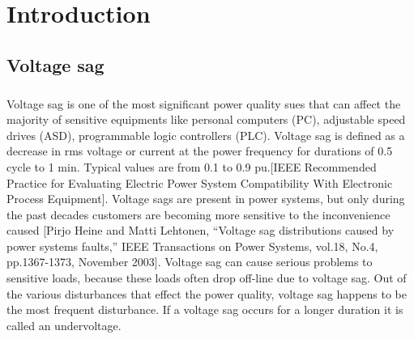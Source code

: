 \documentclass[17pt, a4paper]{extreport}
\begin{document}
\tableofcontents
\chapter[Introduction]{Introduction}
\section[Voltage sag]{Voltage sag}
\paragraph{}
Voltage sag is one of the most significant power quality sues that can affect the majority of sensitive equipments like personal computers (PC), adjustable speed drives (ASD), programmable logic controllers (PLC). Voltage sag is defined as a decrease in rms voltage or current at the power frequency for durations of 0.5 cycle to 1 min. Typical values are from 0.1 to 0.9 pu.[IEEE Recommended Practice for Evaluating Electric Power System Compatibility With Electronic Process Equipment]. Voltage sags are present in power systems, but only during the past decades customers are becoming more sensitive to the inconvenience caused [Pirjo Heine and Matti Lehtonen, “Voltage sag distributions caused by power systems faults,” IEEE Transactions on Power Systems, vol.18, No.4, pp.1367-1373, November 2003]. Voltage sag can cause serious problems to sensitive loads, because these loads often drop off-line due to voltage sag. Out of the various disturbances that effect the power quality, voltage sag happens to be the most frequent disturbance. If a voltage sag occurs for a longer duration it is called an undervoltage. 
\end{document}
